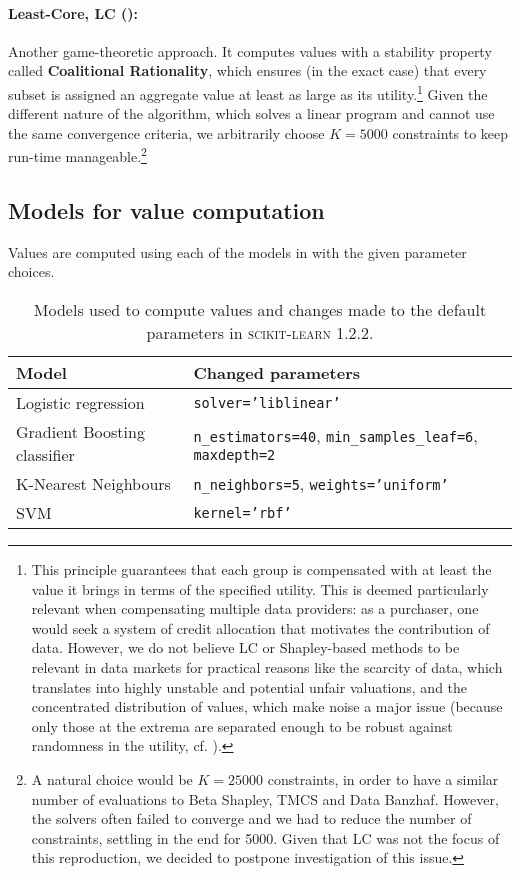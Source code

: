 \documentclass[10pt]{article}
\newcommand{\tmdfn}[1]{\textbf{#1}}
\newcommand{\tmname}[1]{\textsc{#1}}
\newcommand{\tmstrong}[1]{\textbf{#1}}
\newcommand{\python}[1]{\texttt{#1}}
\begin{document}
\paragraph{Least-Core, LC ({\cite{yan_if_2021}}):}Another game-theoretic
approach. It computes values with a stability property called
{\tmdfn{Coalitional Rationality}}, which ensures (in the exact case) that
every subset is assigned an aggregate value at least as large as its
utility.\footnote{This principle guarantees that each group is compensated
with at least the value it brings in terms of the specified utility. This is
deemed particularly relevant when compensating multiple data providers: as a
purchaser, one would seek a system of credit allocation that motivates the
contribution of data. However, we do not believe LC or Shapley-based methods
to be relevant in data markets for practical reasons like the scarcity of
data, which translates into highly unstable and potential unfair valuations,
and the concentrated distribution of values, which make noise a major issue
(because only those at the extrema are separated enough to be robust against
randomness in the utility, cf. ).} Given the different
nature of the algorithm, which solves a linear program and cannot use the same
convergence criteria, we arbitrarily choose $K = 5000$ constraints to keep
run-time manageable.\footnote{A natural choice would be $K = 25000$
constraints, in order to have a similar number of evaluations to Beta Shapley,
TMCS and Data Banzhaf. However, the solvers often failed to converge and we
had to reduce the number of constraints, settling in the end for 5000. Given
that LC was not the focus of this reproduction, we decided to postpone
investigation of this issue.}

\subsection{Models for value computation}

Values are computed using each of the models in 
with the given parameter choices.

\begin{table}[h]
  \begin{tabular}{ll}
    {\tmstrong{Model}} & {\tmstrong{Changed parameters}}\\
    \hline
    Logistic regression & {\small{{\python{solver='liblinear'}}}}\\
    Gradient Boosting classifier & {\small{{\python{n\_estimators=40}},
    {\python{min\_samples\_leaf=6}}, {\python{maxdepth=2}}}}\\
    K-Nearest Neighbours & {\small{{\python{n\_neighbors=5}},
    {\python{weights='uniform'}}}}\\
    SVM & {\small{{\python{kernel='rbf'}}}}
  \end{tabular}
  \caption{\label{tab:models-for-values}Models used to compute values and
  changes made to the default parameters in {\tmname{scikit-learn}} 1.2.2.}
\end{table}
\end{document}
